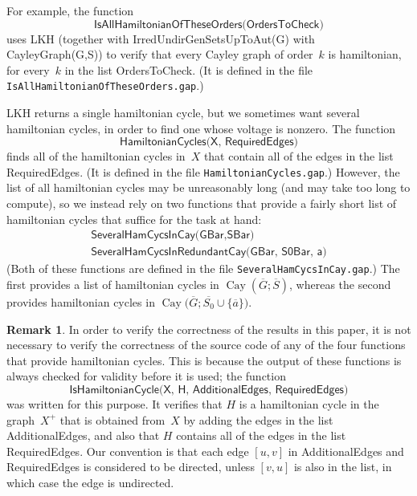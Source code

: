 \documentclass[]{amcjoucc}
\theoremstyle{plain}
\theoremstyle{definition}
\theoremstyle{definition}
\newtheorem{rem}[equation]{Remark}
\DeclareMathOperator{\Cay}{Cay}
\newcommand{\quot}{\overline}
\newcommand{\filename}[1]{\texttt{#1}}
\newcommand{\function}[1]{\textsf{#1}}
\begin{document}
For example, the function
	$$ \function{IsAllHamiltonianOfTheseOrders(OrdersToCheck)} $$
uses \function{LKH} (together with \function{IrredUndirGenSetsUpToAut(G)} with \function{CayleyGraph(G,S)}) to verify that every Cayley graph of order~$k$ is hamiltonian, for every~$k$ in the list \function{OrdersToCheck}. (It is defined in the file \filename{IsAllHamiltonianOfTheseOrders.gap}.)

\function{LKH} returns a single hamiltonian cycle, but we sometimes want several hamiltonian cycles, in order to find one whose voltage is nonzero. The function 
	$$ \function{HamiltonianCycles(X, RequiredEdges)} $$
finds all of the hamiltonian cycles in~$X$ that contain all of the edges in the list \function{RequiredEdges}. (It is defined in the file \filename{HamiltonianCycles.gap}.) However, the list of all hamiltonian cycles may be unreasonably long (and may take too long to compute), so we instead rely on two functions that provide a fairly short list of hamiltonian cycles that suffice for the task at hand:
	$$ \begin{array}{l}
	\function{SeveralHamCycsInCay(GBar,SBar)} \\
	\function{SeveralHamCycsInRedundantCay(GBar, S0Bar, a)}
	\end{array} $$
(Both of these functions are defined in the file \filename{SeveralHamCycsInCay.gap}.) The first provides a list of hamiltonian cycles in $\Cay(\quot G; \quot S)$, whereas the second provides hamiltonian cycles in $\Cay\bigl(\quot G; \quot{S_0} \cup \{\quot a \} \bigr)$. 

\begin{rem}
In order to verify the correctness of the results in this paper, it is not necessary to verify the correctness of the source code of any of the four functions that provide hamiltonian cycles. This is because the output of these functions is always checked for validity before it is used; the function
	$$ \function{IsHamiltonianCycle(X, H, AdditionalEdges, RequiredEdges)} $$
was written for this purpose. It verifies that $H$ is a hamiltonian cycle in the graph~$X^+$ that is obtained from~$X$ by adding the edges in the list \function{AdditionalEdges}, and also that $H$ contains all of the edges in the list \function{RequiredEdges}. Our convention is that each edge $[u,v]$ in \function{AdditionalEdges} and \function{RequiredEdges} is considered to be directed, unless $[v,u]$ is also in the list, in which case the edge is undirected.
\end{rem}
\end{document}
